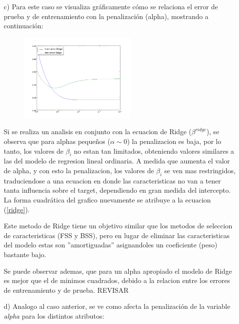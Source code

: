 \documentclass[10pt]{article}
\begin{document}
\begin{itemize}
\item[c)] Para este caso se visualiza gráficamente cómo se relaciona el error de prueba y de entrenamiento con la penalización (alpha), mostrando a continuación:\\

\begin{figure}[h]
    \centering
    \includegraphics[width=0.55\textwidth]{images/alphas_ridge}
    \caption{}
    \label{fig:mesh1}
\end{figure}

Si se realiza un analisis en conjunto con la ecuacion de Ridge ($\beta^{ridge}$), se observa que para alphas pequeños ($\alpha \sim 0$) la penalizacion es baja, por lo tanto, los valores de $\beta_i$ no estan tan limitados, obteniendo valores similares a las del modelo de regresion lineal ordinaria. A medida que aumenta el valor de alpha, y con esto la penalizacion, los valores de $\beta_i$ se ven mas restringidos, traduciendose a una ecuacion en donde las caracteristicas no van a tener tanta influencia sobre el target, dependiendo en gran medida del intercepto.\\
La forma cuadrática del grafico nuevamente se atribuye a la ecuacion (\eqref{ridge}).

Este metodo de Ridge tiene un objetivo similar que los metodos de seleccion de caracteristicas (FSS y BSS), pero en lugar de eliminar las caracteristicas del modelo estas son ''amortiguadas'' asignandoles un coeficiente (peso) bastante bajo.

Se puede observar ademas, que para un alpha apropiado el modelo de Ridge es mejor que el de minimos cuadrados, debido a la relacion entre los errores de entrenamiento y de prueba. REVISAR


\item[d)] Analogo al caso anterior, se ve como afecta la penalización de la variable \textit{alpha} para los distintos atributos:\\


\end{itemize}
\end{document}

